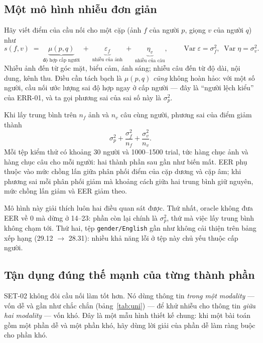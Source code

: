 \documentclass[11pt,a4paper]{article}
\begin{document}
\subsection{Một mô hình nhiễu đơn giản}
Hãy viết điểm của cầu nối cho một cặp (ảnh $f$ của người $p$, giọng $v$ của người $q$) như
\begin{equation}
s(f,v) \;=\; \underbrace{\mu(p,q)}_{\text{độ hợp cấp người}} \;+\; \underbrace{\varepsilon_f}_{\text{nhiễu của ảnh}} \;+\; \underbrace{\eta_v}_{\text{nhiễu của câu}},
\qquad \operatorname{Var}\varepsilon=\sigma_f^2,\;\operatorname{Var}\eta=\sigma_v^2 .
\end{equation}
Nhiễu ảnh đến từ góc mặt, biểu cảm, ánh sáng; nhiễu câu đến từ độ dài, nội dung, kênh thu. Điều cần tách bạch là $\mu(p,q)$ \emph{cũng} không hoàn hảo: với một số người, cầu nối ước lượng sai độ hợp ngay ở cấp người --- đây là ``người lệch kiểu'' của ERR-01, và ta gọi phương sai của sai số này là $\sigma_p^2$.

Khi lấy trung bình trên $n_f$ ảnh và $n_v$ câu cùng người, phương sai của điểm giảm thành
\begin{equation}
\sigma_p^2 + \frac{\sigma_f^2}{n_f} + \frac{\sigma_v^2}{n_v}.
\end{equation}
Mỗi tệp kiểm thử có khoảng 30 người và 1000--1500 trial, tức hàng chục ảnh và hàng chục câu cho mỗi người: hai thành phần sau gần như biến mất. EER phụ thuộc vào mức chồng lấn giữa phân phối điểm của cặp dương và cặp âm; khi phương sai mỗi phân phối giảm mà khoảng cách giữa hai trung bình giữ nguyên, mức chồng lấn giảm và EER giảm theo.

Mô hình này giải thích luôn hai điều quan sát được. Thứ nhất, oracle không đưa EER về 0 mà dừng ở 14--23: phần còn lại chính là $\sigma_p^2$, thứ mà việc lấy trung bình không chạm tới. Thứ hai, tệp \texttt{gender/English} gần như không cải thiện trên bảng xếp hạng (29.12 $\to$ 28.31): nhiều khả năng lỗi ở tệp này chủ yếu thuộc cấp người.

\subsection{Tận dụng đúng thế mạnh của từng thành phần}
SET-02 không đòi cầu nối làm tốt hơn. Nó dùng thông tin \emph{trong một modality} --- vốn dễ và gần như chắc chắn (bảng~\ref{tab:uni}) --- để khử nhiễu cho thông tin \emph{giữa hai modality} --- vốn khó. Đây là một mẫu hình thiết kế chung: khi một bài toán gồm một phần dễ và một phần khó, hãy dùng lời giải của phần dễ làm ràng buộc cho phần khó.
\end{document}
